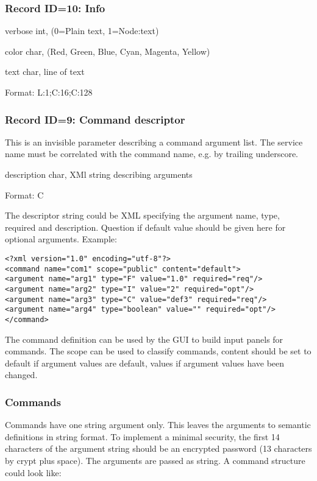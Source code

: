 \subsubsection{Record ID=10: Info}
\begin{compactdesc}
\item[verbose]   int,  (0=Plain text, 1=Node:text)
\item[color]   char,  (Red, Green, Blue, Cyan, Magenta, Yellow)
\item[text]   char,  line of text
\item[Format:] L:1;C:16;C:128
\end{compactdesc}

\subsubsection{Record ID=9: Command descriptor}
This is an invisible parameter describing a command argument list. The service name must be correlated with the command name, e.g. by trailing underscore.
\begin{compactdesc}
\item[description]   char,  XMl string describing arguments
\item[Format:] C
\end{compactdesc}

The descriptor string could be XML specifying the argument name, type, required and description. Question if default value should be given here for optional arguments. Example:
\begin{verbatim}
<?xml version="1.0" encoding="utf-8"?>
<command name="com1" scope="public" content="default">
<argument name="arg1" type="F" value="1.0" required="req"/>
<argument name="arg2" type="I" value="2" required="opt"/>
<argument name="arg3" type="C" value="def3" required="req"/>
<argument name="arg4" type="boolean" value="" required="opt"/>
</command>
\end{verbatim}

The command definition can be used by the GUI to build input panels for commands. The scope can be used to classify commands, content should be set to default if argument values are default, values if argument values have been changed.
\subsubsection{Commands}
Commands have one string argument only. This leaves the arguments to semantic definitions in string format. To implement a minimal security, the first 14 characters of the argument string should be an encrypted password (13 characters by crypt plus space). The arguments are passed as string. A command structure could look like:

